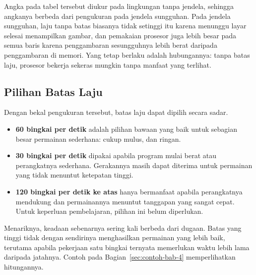 \begin{catatabox}
Angka pada tabel tersebut diukur pada lingkungan tanpa jendela, sehingga
angkanya berbeda dari pengukuran pada jendela sungguhan. Pada jendela
sungguhan, laju tanpa batas biasanya tidak setinggi itu karena menunggu
layar selesai menampilkan gambar, dan pemakaian prosesor juga lebih besar
pada semua baris karena penggambaran sesungguhnya lebih berat daripada
penggambaran di memori. Yang tetap berlaku adalah hubungannya: tanpa batas
laju, prosesor bekerja sekeras mungkin tanpa manfaat yang terlihat.
\end{catatabox}

\subsection{Pilihan Batas Laju}

Dengan bekal pengukuran tersebut, batas laju dapat dipilih secara sadar.

\begin{itemize}
  \item \textbf{60 bingkai per detik} adalah pilihan bawaan yang baik untuk
        sebagian besar permainan sederhana: cukup mulus, dan ringan.
  \item \textbf{30 bingkai per detik} dipakai apabila program mulai berat atau
        perangkatnya sederhana. Gerakannya masih dapat diterima untuk
        permainan yang tidak menuntut ketepatan tinggi.
  \item \textbf{120 bingkai per detik ke atas} hanya bermanfaat apabila
        perangkatnya mendukung dan permainannya menuntut tanggapan yang sangat
        cepat. Untuk keperluan pembelajaran, pilihan ini belum diperlukan.
\end{itemize}

Menariknya, keadaan sebenarnya sering kali berbeda dari dugaan. Batas yang
tinggi tidak dengan sendirinya menghasilkan permainan yang lebih baik,
terutama apabila pekerjaan satu bingkai ternyata memerlukan waktu lebih lama
daripada jatahnya. Contoh pada Bagian~\ref{sec:contoh-bab-4} memperlihatkan
hitungannya.
